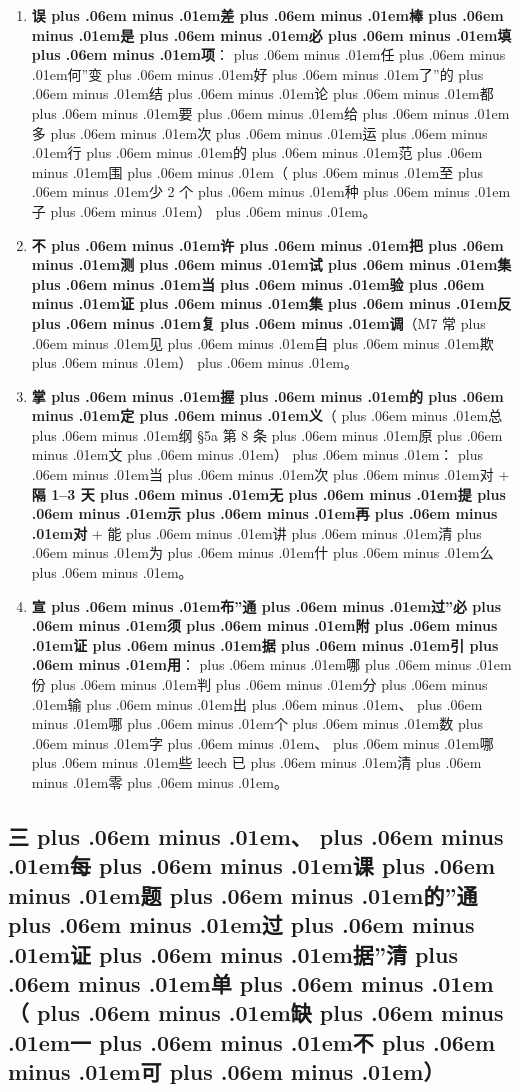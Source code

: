 \documentclass[
]{article}
\def\zh#1{{\zhfont #1}}
\def\sym#1{{\symfont #1}}
\def\zhglue{\hskip0pt plus .06em minus .01em}
\begin{document}
\begin{enumerate}
  \textbf{\zh{不\zhglue 许\zhglue 自\zhglue 创\zhglue 指\zhglue 标}}\zh{：\zhglue 新\zhglue 增\zhglue 指\zhglue 标\zhglue 必\zhglue 须\zhglue 给\zhglue 出\zhglue 定\zhglue 义} + \zh{为\zhglue 什\zhglue 么\zhglue 已\zhglue 有\zhglue 的\zhglue 不\zhglue 管\zhglue 用} + \zh{与\zhglue 已\zhglue 有\zhglue 指\zhglue 标\zhglue 的\zhglue 相\zhglue 关\zhglue 性\zhglue 。}
\item
  \textbf{\zh{误\zhglue 差\zhglue 棒\zhglue 是\zhglue 必\zhglue 填\zhglue 项}}\zh{：\zhglue 任\zhglue 何}''\zh{变\zhglue 好\zhglue 了}''\zh{的\zhglue 结\zhglue 论\zhglue 都\zhglue 要\zhglue 给\zhglue 多\zhglue 次\zhglue 运\zhglue 行\zhglue 的\zhglue 范\zhglue 围\zhglue （\zhglue 至\zhglue 少} 2 \zh{个\zhglue 种\zhglue 子\zhglue ）\zhglue 。}
\item
  \textbf{\zh{不\zhglue 许\zhglue 把\zhglue 测\zhglue 试\zhglue 集\zhglue 当\zhglue 验\zhglue 证\zhglue 集\zhglue 反\zhglue 复\zhglue 调}}\zh{（}M7 \zh{常\zhglue 见\zhglue 自\zhglue 欺\zhglue ）\zhglue 。}
\item
  \textbf{\zh{掌\zhglue 握\zhglue 的\zhglue 定\zhglue 义}}\zh{（\zhglue 总\zhglue 纲} \sym{§}5a \zh{第} 8 \zh{条\zhglue 原\zhglue 文\zhglue ）\zhglue ：\zhglue 当\zhglue 次\zhglue 对} + \textbf{\zh{隔} 1--3 \zh{天\zhglue 无\zhglue 提\zhglue 示\zhglue 再\zhglue 对}} + \zh{能\zhglue 讲\zhglue 清\zhglue 为\zhglue 什\zhglue 么\zhglue 。}
\item
  \textbf{\zh{宣\zhglue 布}''\zh{通\zhglue 过}''\zh{必\zhglue 须\zhglue 附\zhglue 证\zhglue 据\zhglue 引\zhglue 用}}\zh{：\zhglue 哪\zhglue 份\zhglue 判\zhglue 分\zhglue 输\zhglue 出\zhglue 、\zhglue 哪\zhglue 个\zhglue 数\zhglue 字\zhglue 、\zhglue 哪\zhglue 些} leech \zh{已\zhglue 清\zhglue 零\zhglue 。}
\end{enumerate}

\subsection{\zh{三\zhglue 、\zhglue 每\zhglue 课\zhglue 题\zhglue 的}''\zh{通\zhglue 过\zhglue 证\zhglue 据}''\zh{清\zhglue 单\zhglue （\zhglue 缺\zhglue 一\zhglue 不\zhglue 可\zhglue ）}}\label{ux4e09ux6bcfux8bfeux9898ux7684ux901aux8fc7ux8bc1ux636eux6e05ux5355ux7f3aux4e00ux4e0dux53ef}
\end{document}
